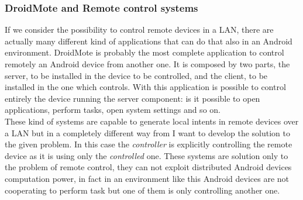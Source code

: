 \subsubsection{DroidMote and Remote control systems}
If we consider the possibility to control remote devices in a LAN, there are actually many different kind of applications that can do that also in an Android environment.
DroidMote is probably the most complete application to control remotely an Android device from another one. It is composed by two parts, the server, to be installed in the device to be controlled, and the client, to be installed in the one which controls. With this application is possible to control entirely the device running the server component: is it possible to open applications, perform tasks, open system settings and so on.\\
These kind of systems are capable to generate local intents in remote devices over a LAN but in a completely different way from I want to develop the solution to the given problem. In this case the \textit{controller} is explicitly controlling the remote device as it is using only the \textit{controlled} one. These systems are solution only to the problem of remote control, they can not exploit distributed Android devices computation power, in fact in an environment like this Android devices are not cooperating to perform task but one of them is only controlling another one.






%

